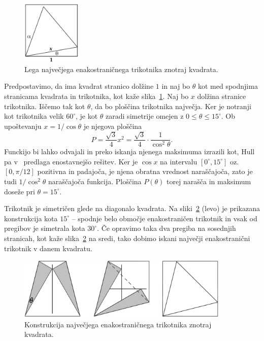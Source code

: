 \begin{figure}[h]
    \centering
    \includegraphics[width=0.25\textwidth]{images/n-kotniki/trik_enak_max1.png}
    \caption[Lega največjega enakostraničnega trikotnika znotraj kvadrata]{Lega največjega enakostraničnega trikotnika znotraj kvadrata.}
    \label{fig:trik_enak_max1}
\end{figure}

Predpostavimo, da ima kvadrat stranico dolžine $1$ in naj bo $\theta$ kot med spodnjima stranicama kvadrata in trikotnika, kot kaže slika~\ref{fig:trik_enak_max1}. Naj bo $x$ dolžina stranice trikotnika. Iščemo tak kot $\theta$, da bo ploščina trikotnika največja. Ker je notranji kot trikotnika velik $60^\circ$, je kot $\theta$ zaradi simetrije omejen z $0 \leq \theta \leq 15^\circ$. Ob upoštevanju $x = 1/ \cos \theta$ je njegova ploščina
$$ P = \frac{\sqrt{3}}{4} x^2 = \frac{\sqrt{3}}{4} \cdot \frac{1}{\cos^2 \theta}. $$
Funckijo bi lahko odvajali in preko iskanja njenega maksimuma izrazili kot, Hull pa v~\cite[str.\ 11]{hull2013} predlaga enostavnejšo rešitev. Ker je $\cos x$ na intervalu $[0^\circ, 15^\circ]$ oz.\ $[0, \pi/12]$ pozitivna in padajoča, je njena obratna vrednost naraščajoča, zato je tudi $1/\cos^2\theta$ naraščajoča funkcija. Ploščina $P(\theta)$ torej narašča in maksimum doseže pri $\theta = 15^\circ$.

Trikotnik je simetričen glede na diagonalo kvadrata. Na sliki~\ref{fig:trik_enak_max2} (levo) je prikazana konstrukcija kota $15^\circ$ -- spodnje belo območje enakostraničen trikotnik in vsak od pregibov je simetrala kota $30^\circ$. Če opravimo taka dva pregiba na sosednjih stranicah, kot kaže slika~\ref{fig:trik_enak_max2} na sredi, tako dobimo iskani največji enakostranični trikotnik v danem kvadratu.

\begin{figure}[h]
    \centering
    \includegraphics[width=0.9\textwidth]{images/n-kotniki/trik_enak_max2.png}
    \caption[Konstrukcija največjega enakostraničnega trikotnika znotraj kvadrata]{Konstrukcija največjega enakostraničnega trikotnika znotraj kvadrata.}
    \label{fig:trik_enak_max2}
\end{figure}

